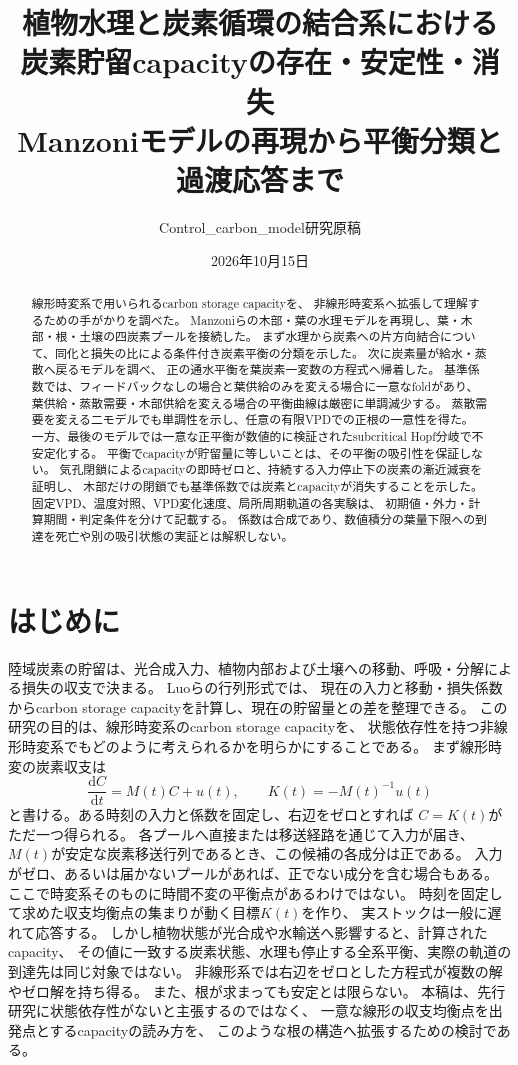\documentclass[a4paper,11pt]{ltjsarticle}
\title{植物水理と炭素循環の結合系における\\炭素貯留capacityの存在・安定性・消失\\
  \large Manzoniモデルの再現から平衡分類と過渡応答まで}
\author{Control\_carbon\_model研究原稿}
\date{2026年10月15日}
\newcommand{\dd}{\mathrm{d}}
\begin{document}
\maketitle
\begin{abstract}
線形時変系で用いられるcarbon storage capacityを、
非線形時変系へ拡張して理解するための手がかりを調べた。
Manzoniらの木部・葉の水理モデルを再現し、葉・木部・根・土壌の四炭素プールを接続した。
まず水理から炭素への片方向結合について、同化と損失の比による条件付き炭素平衡の分類を示した。
次に炭素量が給水・蒸散へ戻るモデルを調べ、
正の通水平衡を葉炭素一変数の方程式へ帰着した。
基準係数では、フィードバックなしの場合と葉供給のみを変える場合に一意なfoldがあり、
葉供給・蒸散需要・木部供給を変える場合の平衡曲線は厳密に単調減少する。
蒸散需要を変える二モデルでも単調性を示し、任意の有限VPDでの正根の一意性を得た。
一方、最後のモデルでは一意な正平衡が数値的に検証されたsubcritical Hopf分岐で不安定化する。
平衡でcapacityが貯留量に等しいことは、その平衡の吸引性を保証しない。
気孔閉鎖によるcapacityの即時ゼロと、持続する入力停止下の炭素の漸近減衰を証明し、
木部だけの閉鎖でも基準係数では炭素とcapacityが消失することを示した。
固定VPD、温度対照、VPD変化速度、局所周期軌道の各実験は、
初期値・外力・計算期間・判定条件を分けて記載する。
係数は合成であり、数値積分の葉量下限への到達を死亡や別の吸引状態の実証とは解釈しない。
\end{abstract}
\tableofcontents
\clearpage

\section{はじめに}
陸域炭素の貯留は、光合成入力、植物内部および土壌への移動、呼吸・分解による損失の収支で決まる。
Luoらの行列形式\cite{luo2022,luoweng2011}では、
現在の入力と移動・損失係数からcarbon storage capacityを計算し、現在の貯留量との差を整理できる。
この研究の目的は、線形時変系のcarbon storage capacityを、
状態依存性を持つ非線形時変系でもどのように考えられるかを明らかにすることである。
まず線形時変の炭素収支は
\begin{equation}\label{eq:ltv}
 \frac{\dd C}{\dd t}=M(t)C+u(t),\qquad
 K(t)=-M(t)^{-1}u(t)
\end{equation}
と書ける。ある時刻の入力と係数を固定し、右辺をゼロとすれば
$C=K(t)$がただ一つ得られる。
各プールへ直接または移送経路を通じて入力が届き、
$M(t)$が安定な炭素移送行列であるとき、この候補の各成分は正である。
入力がゼロ、あるいは届かないプールがあれば、正でない成分を含む場合もある。
ここで時変系そのものに時間不変の平衡点があるわけではない。
時刻を固定して求めた収支均衡点の集まりが動く目標$K(t)$を作り、
実ストックは一般に遅れて応答する。
しかし植物状態が光合成や水輸送へ影響すると、計算されたcapacity、
その値に一致する炭素状態、水理も停止する全系平衡、実際の軌道の到達先は同じ対象ではない。
非線形系では右辺をゼロとした方程式が複数の解やゼロ解を持ち得る。
また、根が求まっても安定とは限らない。
本稿は、先行研究に状態依存性がないと主張するのではなく、
一意な線形の収支均衡点を出発点とするcapacityの読み方を、
このような根の構造へ拡張するための検討である。
\end{document}
